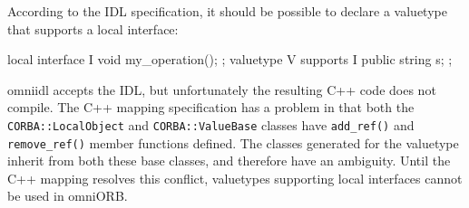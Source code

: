 \documentclass[11pt,twoside,a4paper]{book}
\newcommand{\type}[1]{\texttt{#1}}
\newcommand{\op}[1]{\texttt{#1()}}
\newcommand{\dsc}{\discretionary{}{}{}}
\begin{document}
According to the IDL specification, it should be possible to declare a
valuetype that supports a local interface:

\begin{idllisting}
local interface I {
  void my_operation();
};
valuetype V supports I {
  public string s;
};
\end{idllisting}

omniidl accepts the IDL, but unfortunately the resulting C++ code does
not compile. The C++ mapping specification has a problem in that both
the \type{CORBA::\dsc{}LocalObject} and \type{CORBA::ValueBase}
classes have \op{add\_ref} and \op{remove\_\dsc{}ref} member functions
defined. The classes generated for the valuetype inherit from both
these base classes, and therefore have an ambiguity. Until the C++
mapping resolves this conflict, valuetypes supporting local interfaces
cannot be used in omniORB.



\backmatter


\end{document}
